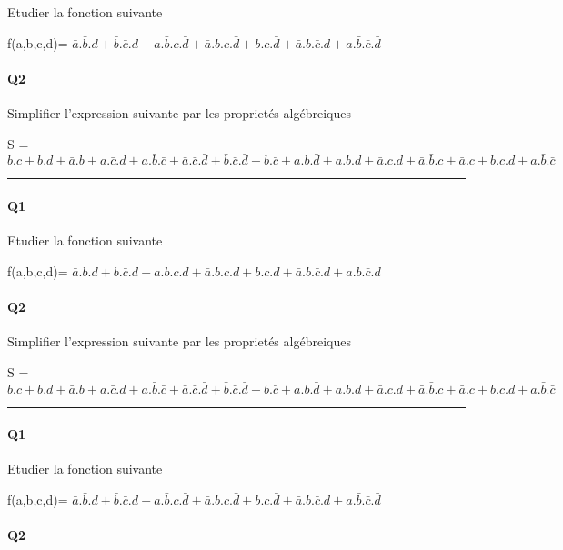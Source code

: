 Etudier la fonction suivante

f(a,b,c,d)= $ \bar a.\bar b.d + \bar b.\bar c.d + a.\bar b.c.\bar d + \bar a.b.c.\bar d  +  b.c.\bar d + \bar a.b.\bar c.d + a.\bar b.\bar c.\bar d $

\paragraph{Q2}

Simplifier l'expression suivante par les proprietés algébreiques 

S = $ b.c + b.d + \bar a.b + a.\bar c.d + a.\bar b.\bar c + \bar a.\bar c.\bar d + \bar b.\bar c.\bar d  +  b.\bar c + a.b.\bar d  +  a.b.d + \bar a.c.d + \bar a.\bar b.c  +  \bar a.c + b.c.d + a.\bar b.\bar c $

\hrule width 1\linewidth
\paragraph{Q1}

Etudier la fonction suivante

f(a,b,c,d)= $ \bar a.\bar b.d + \bar b.\bar c.d + a.\bar b.c.\bar d + \bar a.b.c.\bar d  +  b.c.\bar d + \bar a.b.\bar c.d + a.\bar b.\bar c.\bar d $

\paragraph{Q2}

Simplifier l'expression suivante par les proprietés algébreiques 

S = $ b.c + b.d + \bar a.b + a.\bar c.d + a.\bar b.\bar c + \bar a.\bar c.\bar d + \bar b.\bar c.\bar d  +  b.\bar c + a.b.\bar d  +  a.b.d + \bar a.c.d + \bar a.\bar b.c  +  \bar a.c + b.c.d + a.\bar b.\bar c $

\hrule width 1\linewidth
\paragraph{Q1}

Etudier la fonction suivante

f(a,b,c,d)= $ \bar a.\bar b.d + \bar b.\bar c.d + a.\bar b.c.\bar d + \bar a.b.c.\bar d  +  b.c.\bar d + \bar a.b.\bar c.d + a.\bar b.\bar c.\bar d $

\paragraph{Q2}

